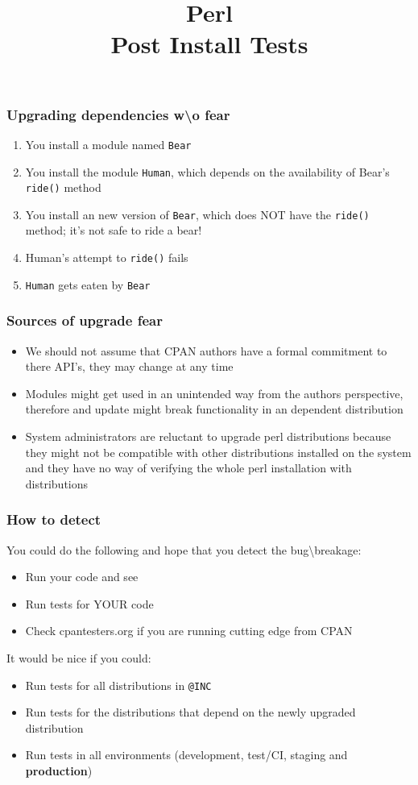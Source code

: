 \documentclass[10pt]{beamer}
\title{Perl \\ Post Install Tests}
\begin{document}
\begin{frame}
\titlepage
\end{frame}


\begin{frame}[fragile]
\frametitle{Upgrading dependencies w\textbackslash o fear}
\begin{enumerate}
  \item You install a module named \verb|Bear|
  \item You install the module \verb|Human|, which depends on the availability of Bear's \verb|ride()| method
  \item You install an new version of \verb|Bear|, which does NOT have the \verb|ride()| method; it's not safe to ride a bear!
  \item Human's attempt to \verb|ride()| fails
  \item \verb|Human| gets eaten by \verb|Bear|
\end{enumerate}
\end{frame}

\begin{frame}
\frametitle{Sources of upgrade fear}
\begin{itemize}
\item We should not assume that CPAN authors have a formal commitment to there API's, they may change at any time
\item Modules might get used in an unintended way from the authors perspective, therefore and update might break functionality in an dependent distribution
\item System administrators are reluctant to upgrade perl distributions because they might not be compatible with other distributions installed on the system and they have no way of verifying the whole perl installation with distributions
\end{itemize}
\end{frame}

\begin{frame}[fragile]
\frametitle{How to detect}
You could do the following and hope that you detect the bug\textbackslash breakage:
\begin{itemize}
\item Run your code and see
\item Run tests for YOUR code
\item Check cpantesters.org if you are running cutting edge from CPAN
\end{itemize}
\vspace{5 mm}
It would be nice if you could:
\begin{itemize}
\item Run tests for all distributions in \verb|@INC|
\item Run tests for the distributions that depend on the newly upgraded distribution
\item Run tests in all environments (development, test/CI, staging and {\bf production})
\end{itemize}
\end{frame}
\end{document}
